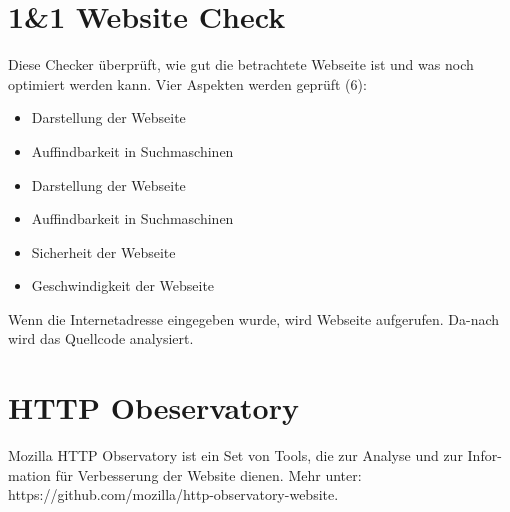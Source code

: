 \section{1\&1 Website Check}

Diese Checker überprüft, wie gut die betrachtete Webseite ist und was noch optimiert werden kann. Vier Aspekten werden geprüft (6):
\begin{itemize}
	\item Darstellung der Webseite
	\item Auffindbarkeit in Suchmaschinen
	\item Darstellung der Webseite
	\item Auffindbarkeit in Suchmaschinen
	\item Sicherheit der Webseite
	\item Geschwindigkeit der Webseite
\end{itemize}

Wenn die Internetadresse eingegeben wurde, wird Webseite aufgerufen. Da-nach wird das Quellcode analysiert.

\section{HTTP Obeservatory}

Mozilla HTTP Observatory ist ein Set von Tools, die zur Analyse und zur Infor-mation für Verbesserung der Website dienen. Mehr unter: https://github.com/mozilla/http-observatory-website.

